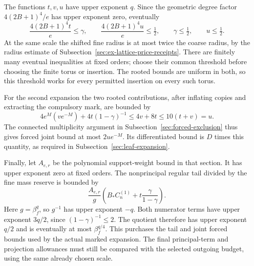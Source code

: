 The functions $t,v,u$ have upper exponent $q$. Since the geometric
degree factor $4(2B+1)^4/e$ has upper exponent zero, eventually
\[
 \frac{4(2B+1)^4t}{e}\le\gamma,\qquad
 \frac{4(2B+1)^4u}{e}\le\tfrac12,\qquad
       \gamma\le\tfrac12,\qquad u\le\tfrac12.
\]
At the same scale the shifted fine radius is at most twice the
coarse radius, by the radius estimate of
Subsection~\ref{sec:ex-lattice-price-receipts}. There are finitely many
eventual inequalities at fixed orders; choose their common
threshold before choosing the finite torus or insertion. The
rooted bounds are uniform in both, so this threshold works for
every permitted insertion on every such torus.

For the second expansion the two rooted contributions, after
inflating copies and extracting the compulsory mark, are bounded by
\[
 4e^M(ve^{-M})+4t(1-\gamma)^{-1}
                   \le4v+8t\le10(t+v)=u.
\]
The connected multiplicity argument in
Subsection~\ref{sec:forced-exclusion} thus gives forced joint bound
at most $2u e^{-M}$. Its differentiated bound is $D$ times this
quantity, as required in Subsection~\ref{sec:leaf-expansion}.

Finally, let $A_{e,r}$ be the polynomial support-weight bound in
that section. It has upper exponent zero at fixed orders. The
nonprincipal regular tail divided by the fine mass reserve is
bounded by
\[
 \frac{A_{e,r}}g\left(B_* C_n^{(1)}+
                          t\frac{\gamma}{1-\gamma}\right).
\]
Here $g=\beta_f^q$, so $g^{-1}$ has upper exponent $-q$.
Both numerator terms have upper exponent $3q/2$, since
$(1-\gamma)^{-1}\le2$. The quotient therefore has upper exponent
$q/2$ and is eventually at most $\beta_f^{q/4}$.
This purchases the tail and joint forced bounds used by the
actual marked expansion. The final principal-term and projection
allowances must still be compared with the selected outgoing
budget, using the same already chosen scale.
